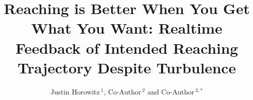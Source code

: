 \documentclass{frontiersSCNS} %
\def\firstAuthorLast{Horowitz {et~al.}} %
\def\Authors{Justin Horowitz\,$^1$, Co-Author\,$^{2}$ and Co-Author\,$^{2,*}$}
\begin{document}
\onecolumn
{}

\title[Running Title]{Reaching is Better When You Get What You Want: Realtime Feedback of Intended Reaching Trajectory Despite Turbulence}
\author[\firstAuthorLast ]{\Authors}
\address{}
\correspondance{}
\extraAuth{}%
\topic{}%

\maketitle

\end{document}
